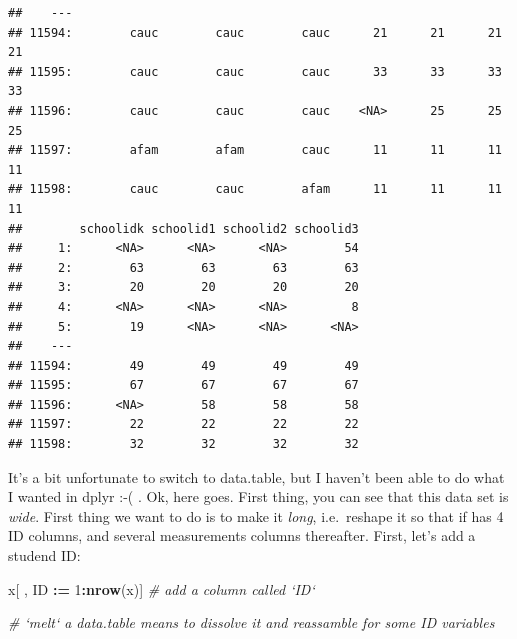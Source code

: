 \documentclass[]{book}
\newenvironment{Shaded}{\begin{snugshade}}{\end{snugshade}}
\newcommand{\KeywordTok}[1]{\textcolor[rgb]{0.13,0.29,0.53}{\textbf{#1}}}
\newcommand{\DecValTok}[1]{\textcolor[rgb]{0.00,0.00,0.81}{#1}}
\newcommand{\StringTok}[1]{\textcolor[rgb]{0.31,0.60,0.02}{#1}}
\newcommand{\CommentTok}[1]{\textcolor[rgb]{0.56,0.35,0.01}{\textit{#1}}}
\newcommand{\OperatorTok}[1]{\textcolor[rgb]{0.81,0.36,0.00}{\textbf{#1}}}
\newcommand{\ErrorTok}[1]{\textcolor[rgb]{0.64,0.00,0.00}{\textbf{#1}}}
\newcommand{\NormalTok}[1]{#1}
\begin{document}
\begin{verbatim}
##    ---                                                                    
## 11594:        cauc        cauc        cauc      21      21      21      21
## 11595:        cauc        cauc        cauc      33      33      33      33
## 11596:        cauc        cauc        cauc    <NA>      25      25      25
## 11597:        afam        afam        cauc      11      11      11      11
## 11598:        cauc        cauc        afam      11      11      11      11
##        schoolidk schoolid1 schoolid2 schoolid3
##     1:      <NA>      <NA>      <NA>        54
##     2:        63        63        63        63
##     3:        20        20        20        20
##     4:      <NA>      <NA>      <NA>         8
##     5:        19      <NA>      <NA>      <NA>
##    ---                                        
## 11594:        49        49        49        49
## 11595:        67        67        67        67
## 11596:      <NA>        58        58        58
## 11597:        22        22        22        22
## 11598:        32        32        32        32
\end{verbatim}

It's a bit unfortunate to switch to data.table, but I haven't been able
to do what I wanted in dplyr :-( . Ok, here goes. First thing, you can
see that this data set is \emph{wide}. First thing we want to do is to
make it \emph{long}, i.e.~reshape it so that if has 4 ID columns, and
several measurements columns thereafter. First, let's add a studend ID:

\begin{Shaded}
\begin{Highlighting}[]
\NormalTok{x[ , ID }\OperatorTok{:}\ErrorTok{=}\StringTok{ }\DecValTok{1}\OperatorTok{:}\KeywordTok{nrow}\NormalTok{(x)]  }\CommentTok{# add a column called `ID`}

\CommentTok{# `melt` a data.table means to dissolve it and reassamble for some ID variables}
\end{Highlighting}
\end{Shaded}
\end{document}
